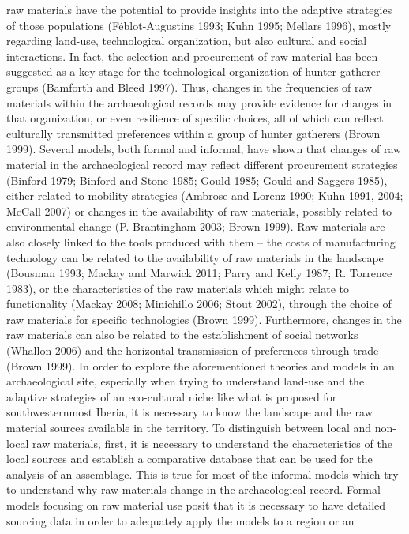 \documentclass[
  a4paper,
  DIV=11,
  numbers=noendperiod]{scrreprt}
\begin{document}
raw materials have the potential to provide insights into the adaptive
strategies of those populations (Féblot-Augustins 1993; Kuhn 1995;
Mellars 1996), mostly regarding land-use, technological organization,
but also cultural and social interactions. In fact, the selection and
procurement of raw material has been suggested as a key stage for the
technological organization of hunter gatherer groups (Bamforth and Bleed
1997). Thus, changes in the frequencies of raw materials within the
archaeological records may provide evidence for changes in that
organization, or even resilience of specific choices, all of which can
reflect culturally transmitted preferences within a group of hunter
gatherers (Brown 1999). Several models, both formal and informal, have
shown that changes of raw material in the archaeological record may
reflect different procurement strategies (Binford 1979; Binford and
Stone 1985; Gould 1985; Gould and Saggers 1985), either related to
mobility strategies (Ambrose and Lorenz 1990; Kuhn 1991, 2004; McCall
2007) or changes in the availability of raw materials, possibly related
to environmental change (P. Brantingham 2003; Brown 1999). Raw materials
are also closely linked to the tools produced with them -- the costs of
manufacturing technology can be related to the availability of raw
materials in the landscape (Bousman 1993; Mackay and Marwick 2011; Parry
and Kelly 1987; R. Torrence 1983), or the characteristics of the raw
materials which might relate to functionality (Mackay 2008; Minichillo
2006; Stout 2002), through the choice of raw materials for specific
technologies (Brown 1999). Furthermore, changes in the raw materials can
also be related to the establishment of social networks (Whallon 2006)
and the horizontal transmission of preferences through trade (Brown
1999). In order to explore the aforementioned theories and models in an
archaeological site, especially when trying to understand land-use and
the adaptive strategies of an eco-cultural niche like what is proposed
for southwesternmost Iberia, it is necessary to know the landscape and
the raw material sources available in the territory. To distinguish
between local and non-local raw materials, first, it is necessary to
understand the characteristics of the local sources and establish a
comparative database that can be used for the analysis of an assemblage.
This is true for most of the informal models which try to understand why
raw materials change in the archaeological record. Formal models
focusing on raw material use posit that it is necessary to have detailed
sourcing data in order to adequately apply the models to a region or an
\end{document}
